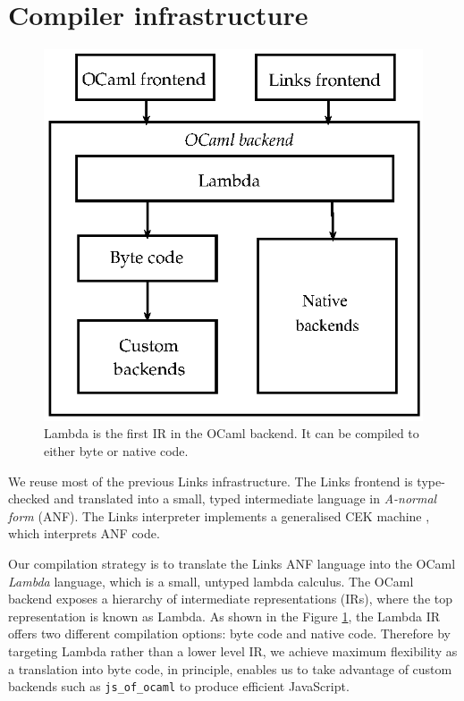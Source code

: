 \documentclass[preprint,numbers]{sigplanconf}
\newcommand{\msgbox}[2]{{%
  \par\noindent\small\color{red}%
  \framebox{\parbox{\dimexpr\linewidth-2\fboxsep-2\fboxrule}{\textbf{#1:} #2}}%
}}
\newcommand{\dhil}[1]{\msgbox{Daniel}{#1}}
\begin{document}
\section{Compiler infrastructure}
\begin{figure}
  \centering
  \includegraphics[scale=0.5]{infrastructure-alt.eps}
  \caption{Lambda is the first IR in the OCaml backend. It can be compiled to either byte or native code.}\label{fig:infra-diagram}
\end{figure}
We reuse most of the previous Links infrastructure. The Links frontend
is type-checked and translated into a small, typed intermediate
language in \emph{A-normal form} (ANF). The Links interpreter
implements a generalised CEK machine \cite{Hillerstrom2016}, which
interprets ANF code.

Our compilation strategy is to translate the Links ANF language into the OCaml
\emph{Lambda} language, which is a small, untyped lambda calculus. The OCaml
backend exposes a hierarchy of intermediate representations (IRs), where the
top representation is known as Lambda. As shown in the Figure
\ref{fig:infra-diagram}, the Lambda IR offers two different compilation
options: byte code and native code. Therefore by targeting Lambda rather than
a lower level IR, we achieve maximum flexibility as a translation into byte
code, in principle, enables us to take advantage of custom backends such as
\texttt{js\_of\_ocaml} to produce efficient JavaScript.
\end{document}
